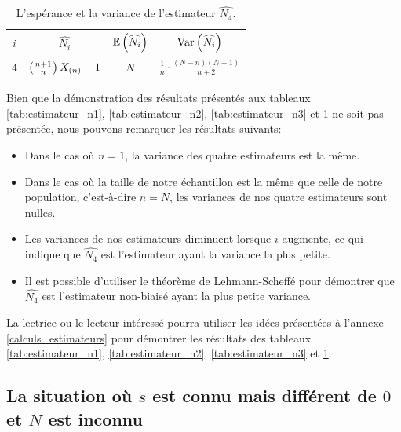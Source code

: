 \documentclass[10pt]{article}
\begin{document}
\begin{table}[ht]
\begin{center}
\begin{tabular}{|c|c|c|c|}
\hline
$i$ & $\widehat{N_i}$ & $\operatorname{\mathbb{E}}\left(\widehat{N_i}\right)$ & $\operatorname{Var}\left(\widehat{N_i}\right)$ \\
\hline
\hline
4 & $\left(\frac{n+1}{n}\right) X_{(n)}-1$ & $N$ & $\frac{1}{n}\cdot\frac{(N-n)(N+1)}{n+2}$ \\
\hline
\end{tabular}
\end{center}
\caption{\label{tab:estimateur_n4} {L'espérance et la variance de l'estimateur $\widehat{N_4}$.} }
\end{table}

Bien que la démonstration des résultats présentés aux tableaux
\ref{tab:estimateur_n1}, \ref{tab:estimateur_n2},
\ref{tab:estimateur_n3} et \ref{tab:estimateur_n4} ne soit pas
présentée, nous pouvons remarquer les résultats suivants:

\begin{itemize}
\item
  Dans le cas où \(n=1\), la variance des quatre estimateurs est la
  même.
\item
  Dans le cas où la taille de notre échantillon est la même que celle de
  notre population, c'est-à-dire \(n=N\), les variances de nos quatre
  estimateurs sont nulles.
\item
  Les variances de nos estimateurs diminuent lorsque \(i\) augmente, ce
  qui indique que \(\widehat{N_4}\) est l'estimateur ayant la variance
  la plus petite.
\item
  Il est possible d'utiliser le théorème de Lehmann-Scheffé pour
  démontrer que \(\widehat{N_4}\) est l'estimateur non-biaisé ayant la
  plus petite variance.
\end{itemize}

La lectrice ou le lecteur intéressé pourra utiliser les idées présentées
à l'annexe \ref{calculs_estimateurs} pour démontrer les résultats des
tableaux \ref{tab:estimateur_n1}, \ref{tab:estimateur_n2},
\ref{tab:estimateur_n3} et \ref{tab:estimateur_n4}.

\hypertarget{la-situation-ou-s-est-connu-mais-different-de-0-et-n-est-inconnu}{%
\subsection{\texorpdfstring{La situation où \(s\) est \textbf{connu}
mais différent de \(0\) et \(N\) est
\textbf{inconnu}}{La situation où s est connu mais différent de 0 et N est inconnu}}\label{la-situation-ou-s-est-connu-mais-different-de-0-et-n-est-inconnu}}
\end{document}

